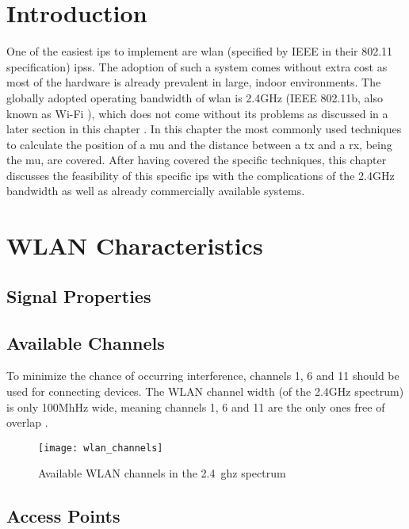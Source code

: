 \section{Introduction}
One of the easiest \acrlong{ips} to implement are \acrshort{wlan} (specified by IEEE in their 802.11 specification) \acrshort{ips}s. The adoption of such a system comes without extra cost as most of the hardware is already prevalent in large, indoor environments.  The globally adopted operating bandwidth of \acrshort{wlan} is 2.4GHz (IEEE 802.11b, also known as Wi-Fi \cite{Li}), which does not come without its problems as discussed in a later section in this chapter \cite{Techopedia} \cite{ElectronicsNotes}\cite{Cisco}. In this chapter the most commonly used techniques to calculate the position of a \acrlong{mu} and the distance between a \acrlong{tx} and a \acrlong{rx}, being the \acrlong{mu}, are covered. After having covered the specific techniques, this chapter discusses the feasibility of this specific \acrlong{ips} with the complications of the 2.4GHz bandwidth as well as already commercially available systems.
\section{WLAN Characteristics}
\subsection{Signal Properties}
\subsection{Available Channels}
To minimize the chance of occurring interference, channels 1, 6 and 11 should be used for connecting devices. The WLAN channel width (of the 2.4GHz spectrum) is only 100MhHz wide, meaning channels 1, 6 and 11 are the only ones free of overlap \cite{Metageek}.
\begin{figure}[h!]
\centering
\texttt{[image: wlan\_channels]}
\caption{Available WLAN channels in the 2.4~\acrshort{ghz} spectrum ~\cite{Metageek}}
\label{fig:ips_topologies}
\end{figure}
\subsection{Access Points}
